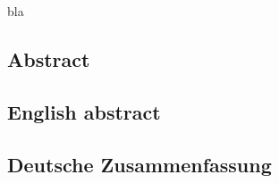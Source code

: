 \documentclass[
	a4paper,
	english,
	twoside,
	openright,               
	11pt                            
	]{report}
\begin{document}
bla \cite{survey1}

\begin{appendices}

\chapter{Abstract} %
\label{cha:abstract}

\section{English abstract} %
\label{sec:english_abstract}



\newpage

\section{Deutsche Zusammenfassung} %
\label{sec:deutsche_zusammenfassung}








% 
% 
% 

\end{appendices}

\cleardoublepage

 



\printglossaries
\end{document}
